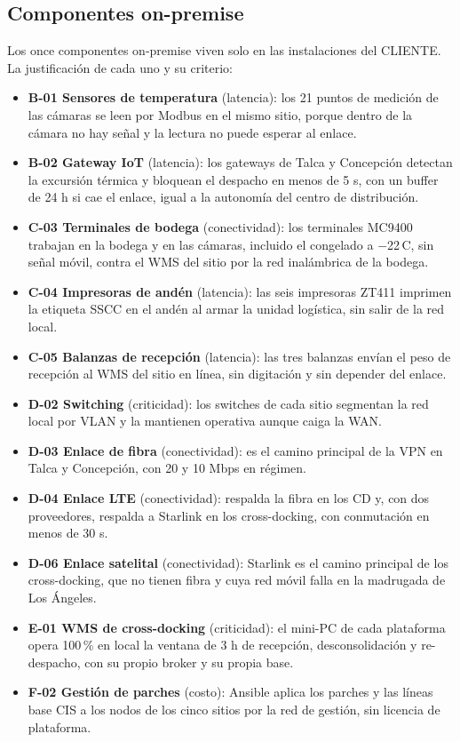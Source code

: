 \subsection{Componentes on-premise}

Los once componentes on-premise viven solo en las instalaciones del CLIENTE. La justificación de cada uno y su criterio:

\begin{itemize}
  \item \textbf{B-01 Sensores de temperatura} (latencia): los 21 puntos de medición de las cámaras se leen por Modbus en el mismo sitio, porque dentro de la cámara no hay señal y la lectura no puede esperar al enlace.
  \item \textbf{B-02 Gateway IoT} (latencia): los gateways de Talca y Concepción detectan la excursión térmica y bloquean el despacho en menos de 5 s, con un buffer de 24 h si cae el enlace, igual a la autonomía del centro de distribución.
  \item \textbf{C-03 Terminales de bodega} (conectividad): los terminales MC9400 trabajan en la bodega y en las cámaras, incluido el congelado a $-$22\,\textdegree{}C, sin señal móvil, contra el WMS del sitio por la red inalámbrica de la bodega.
  \item \textbf{C-04 Impresoras de andén} (latencia): las seis impresoras ZT411 imprimen la etiqueta SSCC en el andén al armar la unidad logística, sin salir de la red local.
  \item \textbf{C-05 Balanzas de recepción} (latencia): las tres balanzas envían el peso de recepción al WMS del sitio en línea, sin digitación y sin depender del enlace.
  \item \textbf{D-02 Switching} (criticidad): los switches de cada sitio segmentan la red local por VLAN y la mantienen operativa aunque caiga la WAN.
  \item \textbf{D-03 Enlace de fibra} (conectividad): es el camino principal de la VPN en Talca y Concepción, con 20 y 10 Mbps en régimen.
  \item \textbf{D-04 Enlace LTE} (conectividad): respalda la fibra en los CD y, con dos proveedores, respalda a Starlink en los cross-docking, con conmutación en menos de 30 s.
  \item \textbf{D-06 Enlace satelital} (conectividad): Starlink es el camino principal de los cross-docking, que no tienen fibra y cuya red móvil falla en la madrugada de Los Ángeles.
  \item \textbf{E-01 WMS de cross-docking} (criticidad): el mini-PC de cada plataforma opera 100\,\% en local la ventana de 3 h de recepción, desconsolidación y re-despacho, con su propio broker y su propia base.
  \item \textbf{F-02 Gestión de parches} (costo): Ansible aplica los parches y las líneas base CIS a los nodos de los cinco sitios por la red de gestión, sin licencia de plataforma.
\end{itemize}

